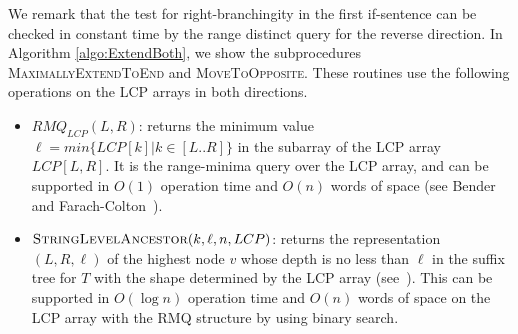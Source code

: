 We remark that the test for right-branchingity in the first if-sentence can be checked in constant time by the range distinct query for the reverse direction. 
In Algorithm \ref{algo:ExtendBoth}, we show the subprocedures \textsc{MaximallyExtendToEnd} and \textsc{MoveToOpposite}. These routines use the following operations on the LCP arrays in both directions.
\begin{itemize}
    \item $RMQ_{LCP}(L,R)$: returns the minimum value $\ell = min\{LCP[k] | k \in [L..R]\}$ in the subarray of the LCP array $LCP[L,R]$.
    It is the range-minima query over the LCP array, and can be supported in $O(1)$ operation time and $O(n)$ words of space (see Bender and Farach-Colton~\cite{bender:colton2000thelcaproblem}).
    
    \item $\textsc{StringLevelAncestor}(k,\ell,n,LCP)$: returns the representation $(L,R,\ell)$ of the highest node $v$ whose depth is no less than $\ell$ in the suffix tree for $T$ with the shape determined by the LCP array (see~\cite{belazzougui2020linear}). This can be supported in $O(\log n)$ operation time and $O(n)$ words of space on the LCP array with the RMQ structure by using binary search.
\end{itemize}



